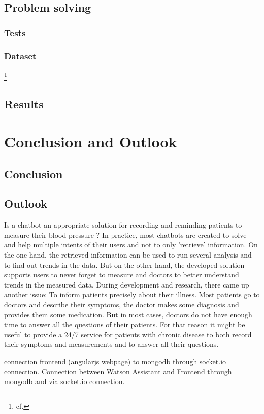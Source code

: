\section{Problem solving}
\subsection{Tests}
\subsection{Dataset}
\footnote{cf.\autocite{kaggle}}

\section{Results}

\chapter{Conclusion and Outlook }
\section{Conclusion}

\section{Outlook}
Is a chatbot an appropriate solution for recording and reminding patients to measure their blood pressure ? 
In practice, most chatbots are created to solve and help multiple intents of their users and not to only 'retrieve' information.
On the one hand, the retrieved information can be used to run several analysis and to find out trends in the data. But on the other hand, the developed solution  supports users to never forget to measure and doctors to better understand trends in the measured data.
During development and research, there came up another issue: To inform patients precisely about their illness. Most patients go to doctors and describe their symptoms, the doctor makes some diagnosis and provides them some medication. But in most cases, doctors do not have enough time to answer all the questions of their patients. For that reason it might be useful to provide a 24/7 service for patients with chronic disease to both record their symptoms and measurements and to answer all their questions.


connection frontend (angularjs webpage) to mongodb through socket.io connection.
Connection between Watson Assistant and Frontend through mongodb and via socket.io connection.


